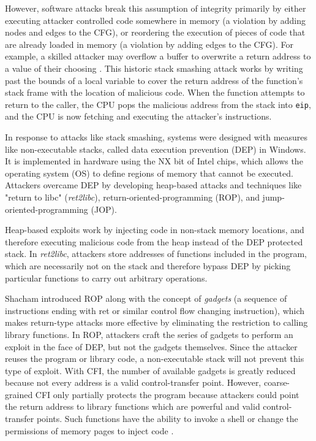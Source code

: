 \documentclass[conference,compsoc]{IEEEtran}
\begin{document}
However, software attacks break this assumption of integrity primarily by either executing attacker controlled code somewhere in memory (a violation by adding nodes and edges to the CFG), or reordering the execution of pieces of code that are already loaded in memory (a violation by adding edges to the CFG). For example, a skilled attacker may overflow a buffer to overwrite a return address to a value of their choosing \cite{alephone}. This historic stack smashing attack works by writing past the bounds of a local variable to cover the return address of the function's stack frame with the location of malicious code\cite{alephone}. When the function attempts to return to the caller, the CPU pops the malicious address from the stack into \texttt{eip}, and the CPU is now fetching and executing the attacker's instructions.

In response to attacks like stack smashing, systems were designed with measures like non-executable stacks, called data execution prevention (DEP) in Windows. It is implemented in hardware using the NX bit of Intel chips, which allows the operating system (OS) to define regions of memory that cannot be executed. Attackers overcame DEP by developing heap-based attacks and techniques like "return to libc" (\emph{ret2libc}), return-oriented-programming (ROP), and jump-oriented-programming (JOP).

Heap-based exploits work by injecting code in non-stack memory locations, and therefore executing malicious code from the heap instead of the DEP protected stack\cite{Foster}. In \emph{ret2libc}, attackers store addresses of functions included in the program, which are necessarily not on the stack and therefore bypass DEP by picking particular functions to carry out arbitrary operations\cite{SolarDesigner}.

Shacham introduced ROP along with the concept of \emph{gadgets} (a sequence of instructions ending with ret or similar control flow changing instruction), which makes return-type attacks more effective by eliminating the restriction to calling library functions\cite{Shacham:2007}. In ROP, attackers craft the series of gadgets to perform an exploit in the face of DEP, but not the gadgets themselves\cite{goktas}. Since the attacker reuses the program or library code, a non-executable stack will not prevent this type of exploit. With CFI, the number of available gadgets is greatly reduced because not every address is a valid control-transfer point. However, coarse-grained CFI only partially protects the program because attackers could point the return address to library functions which are powerful and valid control-transfer points\cite{carlini}. Such functions have the ability to invoke a shell or change the permissions of memory pages to inject code \cite{goktas}.
\end{document}
